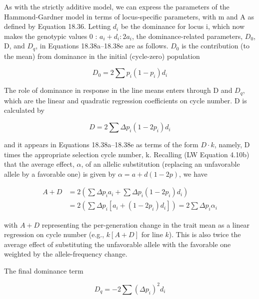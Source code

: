 \documentclass{article}
\begin{document}
As with the strictly additive model, we can express the parameters of the Hammond-Gardner model in terms of locus-specific parameters, with m and A as defined by Equation 18.36. Letting  $ d_i $ be the dominance for locus i, which now makes the genotypic values 0 :  $ a_i + d_i : 2a_i $, the dominance-related parameters,  $ D_0 $, D, and  $ D_q $, in Equations 18.38a–18.38e are as follows.  $ D_0 $ is the contribution (to the mean) from dominance in the initial (cycle-zero) population

\begin{equation}
D_{0}=2\sum p_{i}(1-p_{i})d_{i}
\tag{18.39a}
\label{eq:18_39a}
\end{equation}

The role of dominance in response in the line means enters through D and  $ D_{q} $, which are the linear and quadratic regression coefficients on cycle number. D is calculated by

\begin{equation}
D=2\sum\Delta p_{i}(1-2p_{i})d_{i}
\tag{18.39b}
\label{eq:18_39b}
\end{equation}

and it appears in Equations 18.38a–18.38e as terms of the form  $ D \cdot k $, namely, D times the appropriate selection cycle number, k. Recalling (LW Equation 4.10b) that the average effect,  $ \alpha $, of an allelic substitution (replacing an unfavorable allele by a favorable one) is given by  $ \alpha = a + d(1 - 2p) $, we have

\begin{equation}
\begin{align*}A+D&=2\left(\sum\Delta p_i a_i+\sum\Delta p_i(1-2p_i)d_i\right)\\&=2\left(\sum\Delta p_i\left[a_i+(1-2p_i)d_i\right]\right)=2\sum\Delta p_i\alpha_i\end{align*}
\tag{18.39c}
\label{eq:18_39c}
\end{equation}

with  $ A+D $ representing the per-generation change in the trait mean as a linear regression on cycle number (e.g.,  $ k[A+D] $ for line  $ k $). This is also twice the average effect of substituting the unfavorable allele with the favorable one weighted by the allele-frequency change.

The final dominance term

\begin{equation}
D_{q}=-2\sum\left(\Delta p_{i}\right)^{2}d_{i}
\tag{18.39d}
\label{eq:18_39d}
\end{equation}
\end{document}
